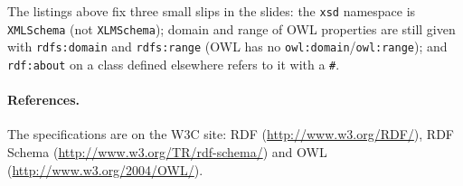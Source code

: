\begin{nbwarning}
The listings above fix three small slips in the slides: the \texttt{xsd} namespace is
\texttt{XMLSchema} (not \texttt{XLMSchema}); domain and range of OWL properties are
still given with \texttt{rdfs:domain} and \texttt{rdfs:range} (OWL has no
\texttt{owl:domain}/\texttt{owl:range}); and \texttt{rdf:about} on a class defined
elsewhere refers to it with a \texttt{\#}.
\end{nbwarning}

\paragraph{References.} The specifications are on the W3C site: RDF
(\url{http://www.w3.org/RDF/}), RDF Schema (\url{http://www.w3.org/TR/rdf-schema/}) and
OWL (\url{http://www.w3.org/2004/OWL/}).
